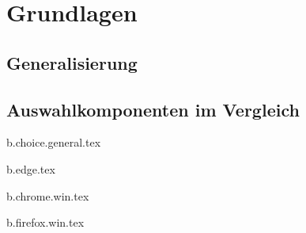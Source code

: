 \chapter{Grundlagen}

\section{Generalisierung}

\section{Auswahlkomponenten im Vergleich}



{b.choice.general.tex}

{b.edge.tex}

{b.chrome.win.tex}

{b.firefox.win.tex}





\cite{online}
